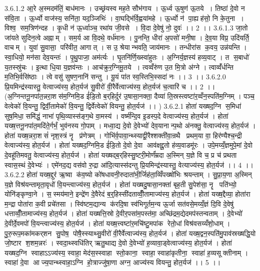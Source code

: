 3.6.1.2
आ॒रे अ॒स्मदम॑तिं॒ बाध॑मानः । उच्छ्र॑यस्व मह॒ते सौभ॑गाय । ऊ॒र्ध्व ऊ॒षुण॑ ऊ॒तये । तिष्ठा॑ दे॒वो न स॑वि॒ता । ऊ॒र्ध्वो वाज॑स्य॒ सनि॑ता॒ यद॒ञ्जिभिः॑ । वा॒घद्भि॑र्वि॒ह्वया॑महे । ऊ॒र्ध्वो न॑ पा॒ह्यह॑सो॒ नि के॒तुना । विश्व॒॒ सम॒त्रिण॑न्दह । कृ॒धी न॑ ऊ॒र्ध्वाञ्च॒ रथा॑य जी॒वसे । वि॒दा दे॒वेषु॑ नो॒ दुवः॑ ।। 2 ।।
3.6.1.3
जा॒तो जा॑यते सुदिन॒त्वे अह्नाम् । सम॒र्य आ वि॒दथे॒ वर्ध॑मानः । पु॒नन्ति॒ धीरा॑ अ॒पसो॑ मनी॒षा । दे॒व॒या विप्र॒ उदि॑यर्ति॒ वाचम् । युवा॑ सु॒वासा॒ परि॑वीत॒ आगात् । स उ॒ श्रेयान्भवति॒ जाय॑मानः । तन्धीरा॑स क॒वय॒ उन्न॑यन्ति । स्वा॒धियो॒ मन॑सा देव॒यन्तः॑ । पृ॒थु॒पाजा॒ अम॑र्त्यः । घृ॒तनि॑र्णि॒ख्स्वा॑हुतः । अ॒ग्निर्य॒ज्ञस्य॑ हव्य॒वाट् । त स॒बाधो॑ य॒तस्स्रु॑चः । इ॒त्था धि॒या य॒ज्ञव॑न्तः । आच॑क्रुर॒ग्निमू॒तये । त्वव्वँरु॑ण उ॒त मि॒त्रो अ॑ग्ने । त्वाव्वँ॑र्धन्ति म॒तिभि॒र्वसि॑ष्ठाः । त्वे वसु॑ सुषण॒नानि॑ सन्तु । यू॒यं पा॑त स्व॒स्तिभि॒स्सदा॑ नः ।। 3 ।।
3.6.2.0
प्रि॒यमिन्द्र॑स्यास्तु॒ वेत्वाज्य॑स्य॒ होत॒र्यज॑ सु॒वीरो॑ वी॒रैर्वेत्वाज्य॑स्य॒ होत॒र्यज॑ च॒त्वारि॑ च ।। 2 ।। (अ॒ग्निन्तनू॒नपा॑त॒न्नरा॒शस॑म॒ग्निमि॒ड ई॑डि॒तो ब॒र्‌हिर्दुर॑ उ॒षासा॒नक्ता॒ दैव्या॑ ति॒स्रस्त्वष्टा॑र॒व्वँन॒स्पति॑म॒ग्निम् । पञ्च॒ वेत्वेको॑ वि॒यन्तु॒ द्विर्वी॒तामेको॑ वि॒यन्तु॒ द्विर्वेत्वेको॑ वियन्तु॒ होत॒र्यज॑ ।। )
3.6.2.1
होता॑ यख्षद॒ग्नि स॒मिधा॑ सुष॒मिधा॒ समि॑द्धं॒ नाभा॑ पृथि॒व्यास्स॑ङ्ग॒थे वा॒मस्य॑ । वर्ष्म॑न्दि॒व इ॒डस्प॒दे वेत्वाज्य॑स्य॒ होत॒र्यज॑ । होता॑ यख्ष॒त्तनू॒नपा॑त॒मदि॑ते॒र्गर्भं॒ भुव॑नस्य गो॒पाम् । मध्वा॒द्य दे॒वो दे॒वेभ्यो॑ देव॒यानान्प॒थो अ॑नक्तु॒ वेत्वाज्य॑स्य॒ होत॒र्यज॑ । होता॑ यख्ष॒न्नरा॒शसं॑ नृश॒स्त्रं नॄ प्र॑णेत्रम् । गोभि॑र्व॒पावा॒न्थ्स्याद्वी॒रैश्शक्ती॑वा॒न्रथै प्रथम॒या वा॒ हिर॑ण्यैश्च॒न्द्री वेत्वाज्य॑स्य॒ होत॒र्यज॑ । होता॑ यख्षद॒ग्निमि॒ड ई॑डि॒तो दे॒वो दे॒वा आव॑क्षद्दू॒तो ह॑व्य॒वाडमू॑रः । उपे॒मय्यँ॒ज्ञमुपे॒मां दे॒वो दे॒वहू॑तिमवतु॒ वेत्वाज्य॑स्य॒ होत॒र्यज॑ । होता॑ यख्षद्ब॒र्‌हिस्सु॒ष्टरी॒मोर्णं॑म्रदा अ॒स्मिन् य॒ज्ञे वि च॒ प्र च॑ प्रथता स्वास॒स्थं दे॒वेभ्यः॑ । एमे॑नद॒द्य वस॑वो रु॒द्रा आ॑दि॒त्यास्स॑दन्तु प्रि॒यमिन्द्र॑स्यास्तु॒ वेत्याज्य॑स्य॒ होत॒र्यज॑ ।। 4 ।।
3.6.2.2
होता॑ यख्ष॒द्दुर॑ ऋ॒ष्वा क॑व॒ष्यो को॑षधावनी॒रुदाता॑भी॒र्जिह॑ता॒व्विँपख्षो॑भिः श्रयन्ताम् । सु॒प्रा॒य॒णा अ॒स्मिन् य॒ज्ञे विश्र॑यन्तामृता॒वृधो॑ वि॒यन्त्वाज्य॑स्य॒ होत॒र्यज॑ । होता॑ यख्षदु॒षासा॒नक्ता॑ बृह॒ती सु॒पेश॑सा॒ नॄ पति॑भ्यो॒ योनि॑ङ्कृण्वा॒ने । स॒॒स्मय॑माने॒ इन्द्रे॑ण दे॒वैरेदं ब॒र्॒हिस्सी॑दताव्वीँ॒तामाज्य॑स्य॒ होत॒र्यज॑ । होता॑ यख्ष॒द्दैव्या॒ होता॑रा म॒न्द्रा पोता॑रा क॒वी प्रचे॑तसा । स्वि॑ष्टम॒द्यान्य क॑रदि॒षा स्व॑भिगूर्तम॒न्य ऊ॒र्जा सत॑वसे॒मय्यँ॒ज्ञं दि॒वि दे॒वेषु॑ धत्ताव्वीँ॒तामाज्य॑स्य॒ होत॒र्यज॑ । होता॑ यख्षत्ति॒स्रो दे॒वीर॒पसा॑म॒पस्त॑मा॒ अच्छि॑द्रम॒द्येदमप॑स्तन्वताम् । दे॒वेभ्यो॑ दे॒वीर्दे॒वमपो॑ वि॒यन्त्वाज्य॑स्य॒ होत॒र्यज॑ । होता॑ यख्ष॒त्त्वष्टा॑र॒मचि॑ष्टु॒मपा॑क रेतो॒धां विश्र॑वसय्यँशो॒धाम् । पु॒रु॒रूप॒मका॑मकर्‌शन सु॒पोष॒ पोषै॒स्स्याथ्सु॒वीरो॑ वी॒रैर्वेत्वाज्य॑स्य॒ होत॒र्यज॑ । होता॑ यख्ष॒द्वन॒स्पति॑मु॒पाव॑स्रख्षद्धि॒यो जो॒ष्टार॑ श॒शम॒न्नरः॑ । स्वदा॒थ्स्वधि॑तिर् ऋतु॒थाद्य दे॒वो दे॒वेभ्यो॑ ह॒व्यावा॒ड्वेत्वाज्य॑स्य॒ होत॒र्यज॑ । होता॑ यख्षद॒ग्नि स्वाहाऽऽज्य॑स्य॒ स्वाहा॒ मेद॑स॒स्स्वाहा स्तो॒काना॒॒ स्वाहा॒ स्वाहा॑कृतीना॒॒ स्वाहा॑ ह॒व्यसूक्तीनाम् । स्वाहा॑ दे॒वा आज्य॒पान्थ्स्वाहा॒ऽग्नि हो॒त्राज्जु॑षा॒णा अग्न॒ आज्य॑स्य वियन्तु॒ होत॒र्यज॑ ।। 5 ।।
